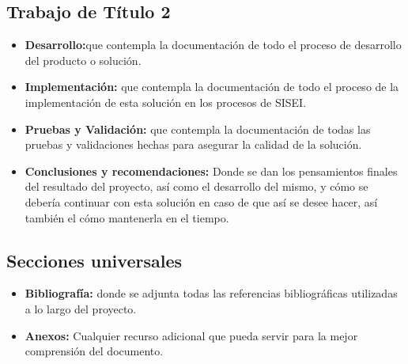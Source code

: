 \subsection*{Trabajo de Título 2}
\begin{itemize}
	\item \textbf{Desarrollo:}que contempla la documentación de todo el proceso de desarrollo del producto o solución.
	\item \textbf{Implementación:} que contempla la documentación de todo el proceso de la implementación de esta solución en los procesos de SISEI.
	\item \textbf{Pruebas y Validación:} que contempla la documentación de todas las pruebas y validaciones hechas para asegurar la calidad de la solución.
	\item \textbf{Conclusiones y recomendaciones:} Donde se dan los pensamientos finales del resultado del proyecto, así como el desarrollo del mismo, y cómo se debería continuar con esta solución en caso de que así se desee hacer, así también el cómo mantenerla en el tiempo.
\end{itemize}

\subsection*{Secciones universales}
\begin{itemize}
	\item \textbf{Bibliografía:} donde se adjunta todas las referencias bibliográficas utilizadas a lo largo del proyecto.
	\item \textbf{Anexos:} Cualquier recurso adicional que pueda servir para la mejor comprensión del documento.
\end{itemize}

\clearpage
